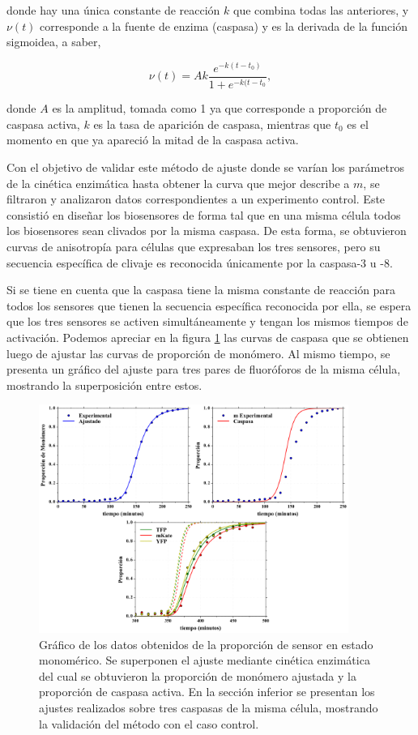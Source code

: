 \noindent donde hay una única constante de reacción $k$ que combina todas las anteriores, y $\nu(t)$ corresponde a la fuente de enzima (caspasa) y es la derivada de la función sigmoidea, a saber,

\begin{equation}
    \nu(t) = A k \frac{e^{-k(t-t_0)}}{1 + e^{-k(t-t_0}},
\end{equation}

\noindent donde $A$ es la amplitud, tomada como 1 ya que corresponde a proporción de caspasa activa, $k$ es la tasa de aparición de caspasa, mientras que $t_0$ es el momento en que ya apareció la mitad de la caspasa activa.

Con el objetivo de validar este método de ajuste donde se varían los parámetros de la cinética enzimática hasta obtener la curva que mejor describe a $m$, se filtraron y analizaron datos correspondientes a un experimento control. Este consistió en diseñar los biosensores de forma tal que en una misma célula todos los biosensores sean clivados por la misma caspasa. De esta forma, se obtuvieron curvas de anisotropía para células que expresaban los tres sensores, pero su secuencia específica de clivaje es reconocida únicamente por la caspasa-3 u -8.

Si se tiene en cuenta que la caspasa tiene la misma constante de reacción para todos los sensores que tienen la secuencia específica reconocida por ella, se espera que los tres sensores se activen simultáneamente y tengan los mismos tiempos de activación. Podemos apreciar en la figura \ref{fig:OneCasp_Fit_m} las curvas de caspasa que se obtienen luego de ajustar las curvas de proporción de monómero. Al mismo tiempo, se presenta un gráfico del ajuste para tres pares de fluoróforos de la misma célula, mostrando la superposición entre estos.

\begin{figure}
    \centering
    \includegraphics[width=0.9\textwidth]{./img/Cap4/OneCasp_Fit_m.png}
    \caption{Gráfico de los datos obtenidos de la proporción de sensor en estado monomérico. Se superponen el ajuste mediante cinética enzimática del cual se obtuvieron la proporción de monómero ajustada y la proporción de caspasa activa. En la sección inferior se presentan los ajustes realizados sobre tres caspasas de la misma célula, mostrando la validación del método con el caso control.}
    \label{fig:OneCasp_Fit_m}
\end{figure}

